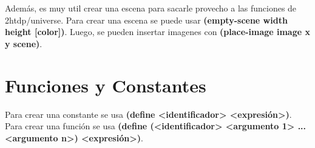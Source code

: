\documentclass[11pt,a4paper]{article}
\begin{document}
Adem\'as, es muy util crear una escena para sacarle provecho a las funciones de 2htdp/universe. Para crear una escena se puede usar \textbf{(empty-scene width height [color])}. Luego, se pueden insertar imagenes con \textbf{(place-image image x y scene)}.

\section{Funciones y Constantes}
Para crear una constante se usa \textbf{(define <identificador> <expresión>)}. Para crear una funci\'on se usa \textbf{(define (<identificador> <argumento 1> ... <argumento n>) <expresión>)}.
\end{document}
